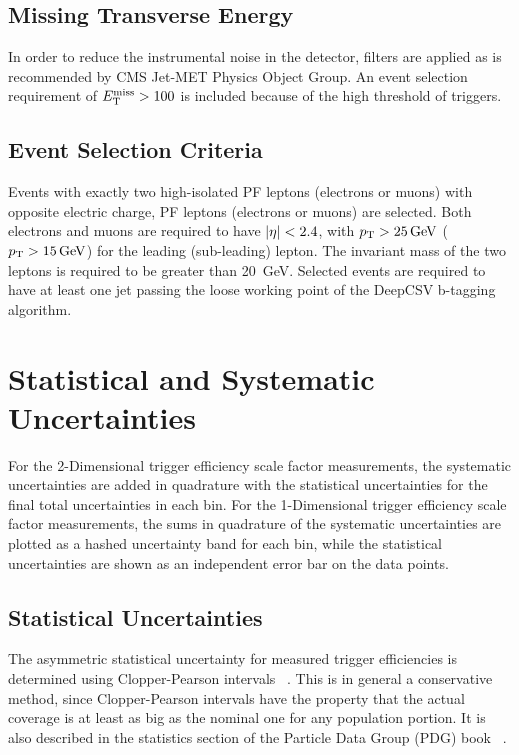 \subsection{Missing Transverse Energy}
In order to reduce the instrumental noise in the detector, \MET filters are applied as is recommended by CMS Jet-MET Physics Object Group.
An event selection requirement of $E_{\mathrm{T}}^{\text{miss}} > 100$ is included because of the high threshold of \MET triggers.
\subsection{Event Selection Criteria}
Events with exactly two high-\pT isolated PF leptons (electrons or muons) with opposite electric charge, PF leptons (electrons or muons) are selected. 
Both electrons and muons are required to have $\left\vert\eta\right\vert < 2.4$, with $\pT > \SI{25}{\GeV}$ ($\pT > \SI{15}{\GeV}$) for the leading (sub-leading) lepton.  
The invariant mass of the two leptons is required to be greater than \SI{20}{\GeV}.  
Selected events are required to have at least one jet passing the loose working point of the DeepCSV b-tagging algorithm.

\section{Statistical and Systematic Uncertainties}
For the 2-Dimensional trigger efficiency scale factor measurements, the systematic uncertainties are added in quadrature with the statistical uncertainties for the final total uncertainties in each bin. 
For the 1-Dimensional trigger efficiency scale factor measurements, the sums in quadrature of the systematic uncertainties are plotted as a hashed uncertainty band for each bin, while the statistical uncertainties are shown as an independent error bar on the data points.

\subsection{Statistical Uncertainties}
The asymmetric statistical uncertainty for measured trigger efficiencies is determined using Clopper-Pearson intervals ~\cite{bib:Cousins:2009kz}.
This is in general a conservative method, since Clopper-Pearson intervals have the property that the actual coverage is at least as big as the nominal one for any population portion. 
It is also described in the statistics section of the Particle Data Group (PDG) book ~\cite{bib:PDG}.

